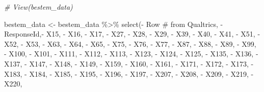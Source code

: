 \documentclass[
]{article}
\newenvironment{Shaded}{\begin{snugshade}}{\end{snugshade}}
\newcommand{\AttributeTok}[1]{\textcolor[rgb]{0.77,0.63,0.00}{#1}}
\newcommand{\CommentTok}[1]{\textcolor[rgb]{0.56,0.35,0.01}{\textit{#1}}}
\newcommand{\FunctionTok}[1]{\textcolor[rgb]{0.00,0.00,0.00}{#1}}
\newcommand{\NormalTok}[1]{#1}
\newcommand{\OtherTok}[1]{\textcolor[rgb]{0.56,0.35,0.01}{#1}}
\newcommand{\SpecialCharTok}[1]{\textcolor[rgb]{0.00,0.00,0.00}{#1}}
\newcommand{\StringTok}[1]{\textcolor[rgb]{0.31,0.60,0.02}{#1}}
\begin{document}
\begin{Shaded}
\begin{Highlighting}[]
\CommentTok{\# View(bestem\_data)}

\NormalTok{bestem\_data }\OtherTok{\textless{}{-}}\NormalTok{ bestem\_data }\SpecialCharTok{\%\textgreater{}\%} 
  \FunctionTok{select}\NormalTok{(}\SpecialCharTok{{-}} \StringTok{\textasciigrave{}}\AttributeTok{Row \# from Qualtrics}\StringTok{\textasciigrave{}}\NormalTok{,}
         \SpecialCharTok{{-}}\NormalTok{ ResponseId,}\SpecialCharTok{{-}}\NormalTok{ X15, }\SpecialCharTok{{-}}\NormalTok{ X16, }\SpecialCharTok{{-}}\NormalTok{ X17, }\SpecialCharTok{{-}}\NormalTok{ X27, }\SpecialCharTok{{-}}\NormalTok{ X28, }\SpecialCharTok{{-}}\NormalTok{ X29, }\SpecialCharTok{{-}}\NormalTok{ X39, }\SpecialCharTok{{-}}\NormalTok{ X40,}
         \SpecialCharTok{{-}}\NormalTok{ X41, }\SpecialCharTok{{-}}\NormalTok{ X51, }\SpecialCharTok{{-}}\NormalTok{ X52, }\SpecialCharTok{{-}}\NormalTok{ X53, }\SpecialCharTok{{-}}\NormalTok{ X63, }\SpecialCharTok{{-}}\NormalTok{ X64, }\SpecialCharTok{{-}}\NormalTok{ X65, }\SpecialCharTok{{-}}\NormalTok{ X75, }\SpecialCharTok{{-}}\NormalTok{ X76, }\SpecialCharTok{{-}}\NormalTok{ X77, }\SpecialCharTok{{-}}\NormalTok{ X87, }\SpecialCharTok{{-}}\NormalTok{ X88, }\SpecialCharTok{{-}}\NormalTok{ X89,}
         \SpecialCharTok{{-}}\NormalTok{ X99, }\SpecialCharTok{{-}}\NormalTok{ X100, }\SpecialCharTok{{-}}\NormalTok{ X101, }\SpecialCharTok{{-}}\NormalTok{ X111, }\SpecialCharTok{{-}}\NormalTok{ X112, }\SpecialCharTok{{-}}\NormalTok{ X113, }\SpecialCharTok{{-}}\NormalTok{ X123, }\SpecialCharTok{{-}}\NormalTok{ X124, }\SpecialCharTok{{-}}\NormalTok{ X125, }\SpecialCharTok{{-}}\NormalTok{ X135, }\SpecialCharTok{{-}}\NormalTok{ X136,}
         \SpecialCharTok{{-}}\NormalTok{ X137, }\SpecialCharTok{{-}}\NormalTok{ X147, }\SpecialCharTok{{-}}\NormalTok{ X148, }\SpecialCharTok{{-}}\NormalTok{ X149, }\SpecialCharTok{{-}}\NormalTok{ X159, }\SpecialCharTok{{-}}\NormalTok{ X160, }\SpecialCharTok{{-}}\NormalTok{ X161, }\SpecialCharTok{{-}}\NormalTok{ X171, }\SpecialCharTok{{-}}\NormalTok{ X172, }\SpecialCharTok{{-}}\NormalTok{ X173, }\SpecialCharTok{{-}}\NormalTok{ X183,}
         \SpecialCharTok{{-}}\NormalTok{ X184, }\SpecialCharTok{{-}}\NormalTok{ X185, }\SpecialCharTok{{-}}\NormalTok{ X195, }\SpecialCharTok{{-}}\NormalTok{ X196, }\SpecialCharTok{{-}}\NormalTok{ X197, }\SpecialCharTok{{-}}\NormalTok{ X207, }\SpecialCharTok{{-}}\NormalTok{ X208, }\SpecialCharTok{{-}}\NormalTok{ X209, }\SpecialCharTok{{-}}\NormalTok{ X219, }\SpecialCharTok{{-}}\NormalTok{ X220,}

\end{Highlighting}
\end{Shaded}
\end{document}
